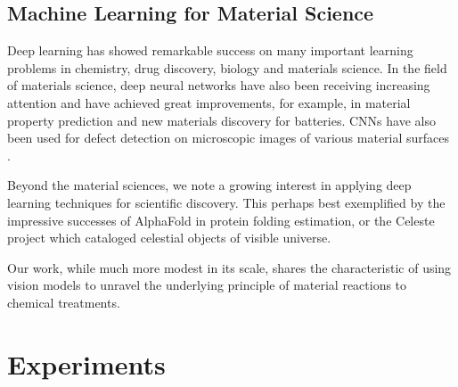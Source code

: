 \documentclass[10pt,twocolumn,letterpaper]{article}
\begin{document}
\subsection{Machine Learning for Material Science}
Deep learning has showed remarkable success on many important 
learning problems in chemistry, drug discovery, biology and materials science.
In the field of materials science, deep neural networks have also been receiving increasing attention and have achieved great improvements, for example, in material property prediction and new materials discovery for batteries.
CNNs have also been used for defect detection on microscopic images of various material surfaces \cite{xxx}.

Beyond the material sciences, we note a growing interest in applying deep learning techniques
for scientific discovery. 
This perhaps best exemplified by the impressive successes of AlphaFold \cite{xxx} in protein folding estimation,
or the Celeste \cite{xxx} project which cataloged celestial objects of visible universe.

Our work, while much more modest in its scale, 
shares the characteristic of using vision models to unravel
the underlying principle of material reactions to chemical treatments.

\section{Experiments}
\end{document}
